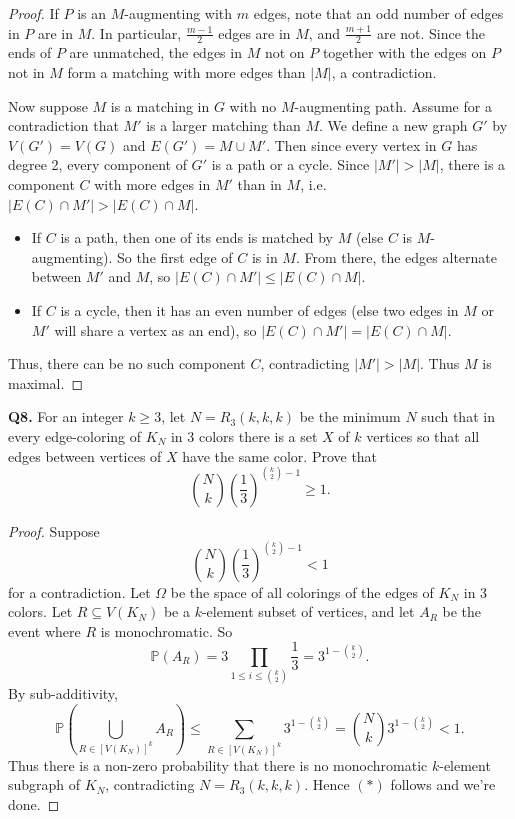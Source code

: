 \begin{proof}
If \( P \) is an \( M \)-augmenting with \( m \) edges, note that an odd number of edges in \( P \) are in \( M \). In particular, \( \frac{m-1}{2}  \)  edges are in \( M \), and \( \frac{m+1}{2}  \) are not. Since the ends of \( P \) are unmatched, the edges in \( M \) not on \( P \) together with the edges on \( P \) not in \( M \) form a matching with more edges than \( |M| \), a contradiction.

Now suppose \( M \) is a matching in \( G \) with no \( M \)-augmenting path. Assume for a contradiction that \( M' \) is a larger matching than \( M \). We define a new graph \( G' \) by \( V(G') = V(G) \) and \( E(G') = M \cup M' \). Then since every vertex in \( G \) has degree 2, every component of \( G' \) is a path or a cycle. Since \( |M'| > |M| \), there is a component \( C \) with more edges in \( M' \) than in \( M \), i.e. \( |E(C) \cap M'| > |E(C) \cap M| \).
\begin{itemize}[nolistsep]
	\item If \( C \) is a path, then one of its ends is matched by \( M \) (else \( C \) is \( M \)-augmenting). So the first edge of \( C \) is in \( M \). From there, the edges alternate between \( M' \) and \( M \), so \( |E(C) \cap M'| \leq |E(C) \cap M| \).
	\item If \( C \) is a cycle, then it has an even number of edges (else two edges in \( M \) or \( M' \) will share a vertex as an end), so \( |E(C) \cap M'| = |E(C) \cap M| \).
\end{itemize}
Thus, there can be no such component \( C \), contradicting \( |M'| > |M| \). Thus \( M \) is maximal.
\end{proof}
\noindent \textbf{Q8.} For an integer \( k \geq 3 \), let \( N = R_{3}(k,k,k)  \) be the minimum \( N \) such that in every edge-coloring of \( K_{N}  \) in 3 colors there is a set \( X \) of \( k \) vertices so that all edges between vertices of \( X \) have the same color. Prove that \[ \binom{N}{k} \left ( \frac{1}{3}  \right ) ^{\binom{k}{2} - 1} \geq 1 \tag{$\ast$}. \]
\begin{proof}
	Suppose \[  \binom{N}{k} \left ( \frac{1}{3}  \right ) ^{\binom{k}{2} - 1} < 1 \] for a contradiction. Let \( \Omega \) be the space of all colorings of the edges of \( K_{N}  \) in 3 colors. Let \( R \subseteq V(K_{N} ) \) be a \( k \)-element subset of vertices, and let \( A_R \) be the event where \( R \) is monochromatic. So \[ \mathbb{P}(A_{R}) = 3 \prod_{1 \leq i \leq \binom{k}{2} }^{} \frac{1}{3}  =  3^{1-\binom{k}{2} }. \] By sub-additivity, \[ \mathbb{P}\left ( \bigcup_{R \in [V(K_{N})]^{k} }^{} A_{R}  \right ) \leq \sum_{R \in [V(K_{N})]^{k}}^{} 3^{1-\binom{k}{2}} = \binom{N}{k} 3^{1 - \binom{k}{2} } < 1.  \] Thus there is a non-zero probability that there is no monochromatic \( k \)-element subgraph of \( K_{N}  \), contradicting \( N = R_{3} (k,k,k) \). Hence \((\ast)\) follows and we're done.
\end{proof}
